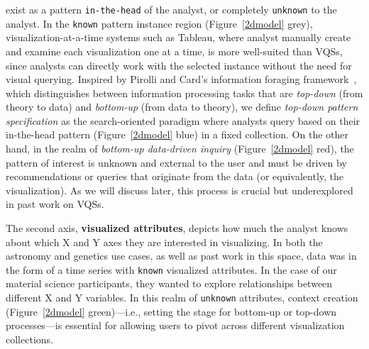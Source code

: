 exist as a pattern \texttt{in-the-head} of the analyst, 
or completely \texttt{unknown} to the analyst. 
In the \texttt{known} pattern instance region (Figure~\ref{2dmodel} grey), visualization-at-a-time systems such as Tableau, 
where analyst manually create and examine each visualization one at a time, 
is more well-suited than VQSs, since analysts can directly work with the selected instance without the need for visual querying. 
Inspired by Pirolli and Card's information 
foraging framework~\cite{Pirolli}, which distinguishes 
between information processing tasks that are \textit{top-down} 
(from theory to data) and \textit{bottom-up} (from data to theory), 
we define \textit{top-down pattern specification} as the search-oriented paradigm where analysts query based on their 
in-the-head pattern (Figure~\ref{2dmodel} blue) in a fixed collection. 
On the other hand, in the realm of \textit{bottom-up 
data-driven inquiry} (Figure~\ref{2dmodel} red), 
the pattern of interest is unknown and external 
to the user and must be driven by recommendations 
or queries that originate from the data (or equivalently, the visualization). 
As we will discuss later, this process is crucial 
but underexplored in past work on VQSs.
\par The second axis, \textbf{visualized attributes}, 
depicts how much the analyst 
knows about which X and Y axes 
they are interested in visualizing. 
In both the astronomy and genetics use cases, 
as well as past work in this space, 
data was in the form of a time series 
with \texttt{known} visualized attributes. 
In the case of our material science participants, 
they wanted to explore relationships between different 
X and Y variables. 
In this realm of \texttt{unknown} attributes, 
context creation (Figure~\ref{2dmodel} green)---i.e.,
setting the stage for bottom-up or top-down processes---is 
essential for allowing users 
to pivot across different visualization collections.%
